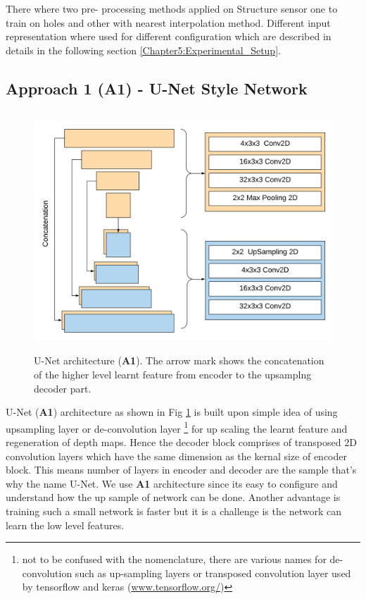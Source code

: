 There where two pre- processing methods applied on Structure sensor one to train on holes and other with nearest interpolation method. Different input representation where used for different configuration which are described in details in the following section \ref{Chapter5:Experimental_Setup}.

\subsection{Approach 1 (A1) - U-Net Style Network}

\begin{figure}[t]
    \centering
    \includegraphics[width = 14cm, height = 9cm]{Figures/A1.png}
    \caption{U-Net architecture (\textbf{A1}). The arrow mark shows the concatenation of the higher level learnt feature from encoder to the upsamplng decoder part.}
    \label{fig:A1-U-NetArchetecture}
\end{figure}{}

U-Net (\textbf{A1}) architecture as shown in Fig \ref{fig:A1-U-NetArchetecture} is built upon simple idea of using upsampling layer or de-convolution layer  \footnote{not to be confused with the nomenclature, there are various names for de-convolution such as up-sampling layers or transposed convolution layer used by tensorflow and keras (\url{www.tensorflow.org/})} for up scaling the learnt feature and regeneration of depth maps. Hence the decoder block comprises of transposed 2D convolution layers which have the same dimension as the kernal size of encoder block. This means number of layers in encoder and decoder are the sample that's why the name U-Net. We use \textbf{A1} architecture since its easy to configure and understand how the up sample of network can be done. Another advantage is training such a small network is faster but it is a challenge is the network can learn the low level features. 

